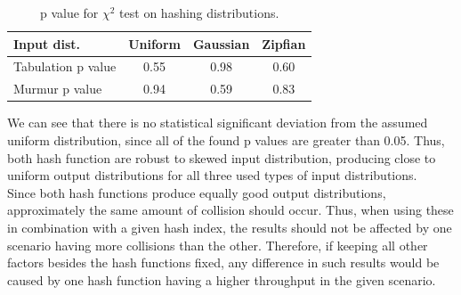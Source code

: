 \documentclass[11pt]{report} %
\begin{document}
\begin{table}[htb]
\centering
\caption{p value for $\chi^2$ test on hashing distributions.}
\begin{tabular}{ | l || c | c | c |}
 \hline
 Input dist. & Uniform & Gaussian & Zipfian \\
 \hline
 Tabulation p value & 0.55 & 0.98 & 0.60  \\
 \hline
 Murmur p value & 0.94 & 0.59 & 0.83  \\
\hline
\end{tabular}
\label{tab:tab_dist}
\end{table}
\noindent
We can see that there is no statistical significant deviation from the assumed uniform distribution, since all of the found p values are greater than 0.05. Thus, both hash function are robust to skewed input distribution, producing close to uniform output distributions for all three used types of input distributions.
\\
Since both hash functions produce equally good output distributions, approximately the same amount of collision should occur. Thus, when using these in combination with a given hash index, the results should not be affected by one scenario having more collisions than the other. Therefore, if keeping all other factors besides the hash functions fixed, any difference in such results would be caused by one hash function having a higher throughput in the given scenario.
\end{document}
